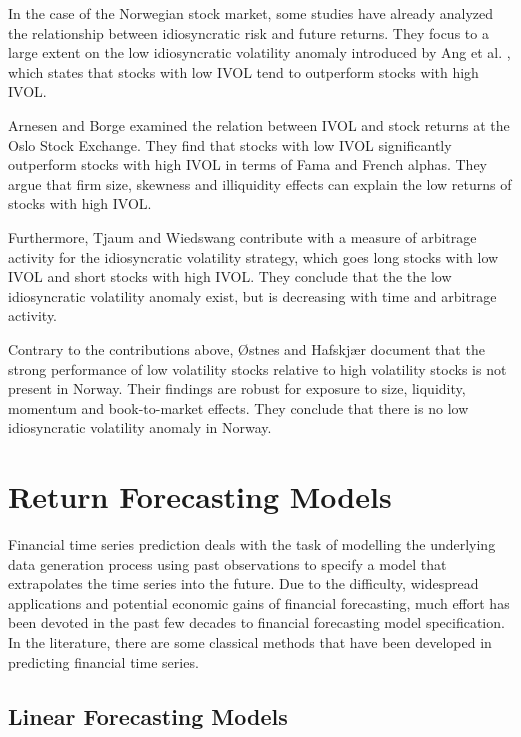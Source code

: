 In the case of the Norwegian stock market, some studies have already analyzed the relationship between idiosyncratic risk and future returns. They focus to a large extent on the low idiosyncratic volatility anomaly introduced by Ang et al. \cite{angetal06}, which states that stocks with low IVOL tend to outperform stocks with high IVOL. 

Arnesen and Borge \cite{arnborge} examined the relation between IVOL and stock returns at the Oslo Stock Exchange. They find that stocks with low IVOL significantly outperform stocks with high IVOL in terms of Fama and French \cite{famafrench} alphas. They argue that firm size, skewness and illiquidity effects can explain the low returns of stocks with high IVOL.

Furthermore, Tjaum and Wiedswang \cite{thaumwiedswang} contribute with a measure of arbitrage activity for the idiosyncratic volatility strategy, which goes long stocks with low IVOL and short stocks with high IVOL. They conclude that the the low idiosyncratic volatility anomaly exist, but is decreasing with time and arbitrage activity. 

Contrary to the contributions above, Østnes and Hafskjær \cite{ostnes} document that the strong performance of low volatility stocks relative to high volatility stocks is not present in Norway. Their findings are robust for exposure to size, liquidity, momentum and book-to-market effects. They conclude that there is no low idiosyncratic volatility anomaly in Norway.


\section{Return Forecasting Models}

Financial time series prediction deals with the task of modelling the underlying data generation process using past observations to specify a model that extrapolates the time series into the future. Due to the difficulty, widespread applications and potential economic gains of financial forecasting, much effort has been devoted in the past few decades to financial forecasting model specification. In the literature, there are some classical methods that have been developed in predicting financial time series. 

\subsection{Linear Forecasting Models}

